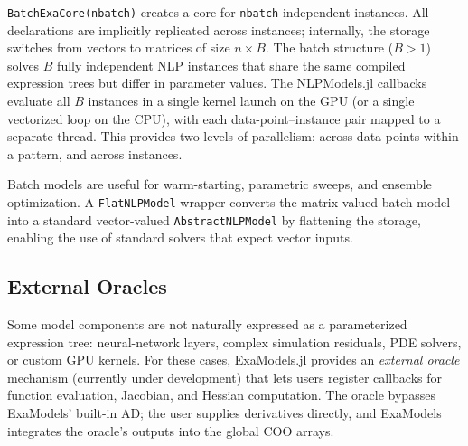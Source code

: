 \documentclass[11pt]{article}
\begin{document}
\texttt{BatchExaCore(nbatch)} creates a core for \texttt{nbatch} independent instances. All declarations are implicitly replicated across instances; internally, the storage switches from vectors to matrices of size $n \times B$. The batch structure ($B > 1$) solves $B$ fully independent NLP instances that share the same compiled expression trees but differ in parameter values. The NLPModels.jl callbacks evaluate all $B$ instances in a single kernel launch on the GPU (or a single vectorized loop on the CPU), with each data-point--instance pair mapped to a separate thread. This provides two levels of parallelism: across data points within a pattern, and across instances.

Batch models are useful for warm-starting, parametric sweeps, and ensemble optimization. A \texttt{FlatNLPModel} wrapper converts the matrix-valued batch model into a standard vector-valued \texttt{AbstractNLPModel} by flattening the storage, enabling the use of standard solvers that expect vector inputs.

\subsection{External Oracles}
\label{sec:extensions:oracles}

Some model components are not naturally expressed as a parameterized expression tree: neural-network layers, complex simulation residuals, PDE solvers, or custom GPU kernels. For these cases, ExaModels.jl provides an \emph{external oracle} mechanism (currently under development) that lets users register callbacks for function evaluation, Jacobian, and Hessian computation. The oracle bypasses ExaModels' built-in AD; the user supplies derivatives directly, and ExaModels integrates the oracle's outputs into the global COO arrays.
\end{document}
